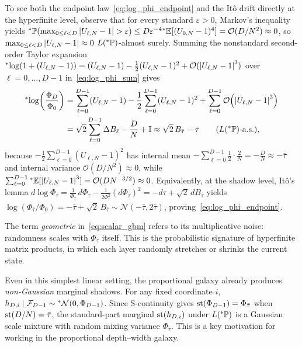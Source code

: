 \begin{proofsketch}
To see both the endpoint law~\eqref{eq:log_phi_endpoint} and the It\^o drift directly at the hyperfinite level, observe that for every standard $\varepsilon > 0$, Markov's inequality yields ${}^*\mathbb{P}(\max_{0 \le \ell < D} \left\lvert U_{\ell,N} - 1 \right\rvert > \varepsilon) \le D\varepsilon^{-4}{}^*\mathbb{E}[(U_{0,N} - 1)^4] = \mathcal{O}(D/N^2) \approx 0$, so $\max_{0 \le \ell < D} \left\lvert U_{\ell,N} - 1 \right\rvert \approx 0$ $L({}^*\mathbb{P})$-almost surely. Summing the nonstandard second-order Taylor expansion ${}^*\!\log(1 + (U_{\ell,N} - 1)) = (U_{\ell,N} - 1) - \frac{1}{2}(U_{\ell,N} - 1)^2 + \mathcal{O}(\left\lvert U_{\ell,N} - 1 \right\rvert^3)$ over $\ell = 0, \dots, D-1$ in~\eqref{eq:log_phi_sum} gives
\begin{equation}\label{eq:ito_log_phi}
\begin{aligned}
{}^*\!\log\!\left(\frac{\Phi_D}{\Phi_0}\right) &= \sum_{\ell=0}^{D-1} (U_{\ell,N} - 1) - \frac{1}{2}\sum_{\ell=0}^{D-1} (U_{\ell,N} - 1)^2 + \sum_{\ell=0}^{D-1} \mathcal{O}\!\left(\left\lvert U_{\ell,N} - 1 \right\rvert^3\right) \\
&= \sqrt{2}\sum_{\ell=0}^{D-1} \Delta B_\ell - \frac{D}{N} + \mathbb{I} \approx \sqrt{2}\,B_{\bar{\tau}} - \bar{\tau} \qquad (L({}^*\mathbb{P})\text{-a.s.}),
\end{aligned}
\end{equation}
because $-\frac{1}{2}\sum_{\ell=0}^{D-1} (U_{\ell,N} - 1)^2$ has internal mean $-\sum_{\ell=0}^{D-1} \frac{1}{2}\cdot\frac{2}{N} = -\frac{D}{N} \approx -\bar{\tau}$ and internal variance $\mathcal{O}(D/N^2) \approx 0$, while $\sum_{\ell=0}^{D-1} {}^*\mathbb{E}[\left\lvert U_{\ell,N} - 1 \right\rvert^3] = \mathcal{O}(D N^{-3/2}) \approx 0$. Equivalently, at the shadow level, It\^o's lemma $d\log\Phi_\tau = \frac{1}{\Phi_\tau}\,d\Phi_\tau - \frac{1}{2\Phi_\tau^2}(d\Phi_\tau)^2 = -d\tau + \sqrt{2}\,dB_\tau$ yields $\log(\Phi_{\bar{\tau}}/\Phi_0) = -\bar{\tau} + \sqrt{2}\,B_{\bar{\tau}} \sim \mathcal{N}(-\bar{\tau}, 2\bar{\tau})$, proving~\eqref{eq:log_phi_endpoint}.
\end{proofsketch}

The term \emph{geometric} in~\eqref{eq:scalar_gbm} refers to its multiplicative noise: randomness scales with $\Phi_\tau$ itself. This is the probabilistic signature of hyperfinite matrix products, in which each layer randomly stretches or shrinks the current state.

Even in this simplest linear setting, the proportional galaxy already produces \emph{non-Gaussian} marginal shadows. For any fixed coordinate $i$, $h_{D,i} \mid \mathcal{F}_{D-1} \sim {}^*\mathcal{N}(0, \Phi_{D-1})$. Since S-continuity gives $\operatorname{st}(\Phi_{D-1}) = \Phi_{\bar{\tau}}$ when $\operatorname{st}(D/N) = \bar{\tau}$, the standard-part marginal $\operatorname{st}(h_{D,i})$ under $L({}^*\mathbb{P})$ is a Gaussian scale mixture with random mixing variance $\Phi_{\bar{\tau}}$. This is a key motivation for working in the proportional depth--width galaxy.

